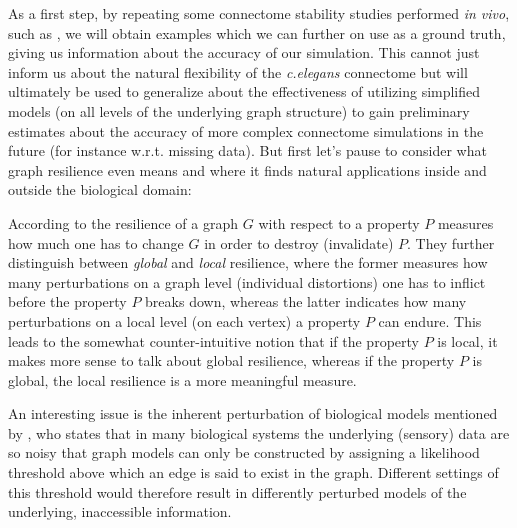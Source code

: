 \documentclass[a4paper,11pt]{article}
\begin{document}
As a first step, by repeating some connectome stability studies performed \emph{in vivo}, such as \citep{Avery1989473}, we will obtain examples which we can further on use as a ground truth, giving us information about the accuracy of our simulation. This cannot just inform us about the natural flexibility of the \emph{c.elegans} connectome but will ultimately be used to generalize about the effectiveness of utilizing simplified models (on all levels of the underlying graph structure) to gain preliminary estimates about the accuracy of more complex connectome simulations in the future (for instance w.r.t. missing data). But first let's pause to consider what graph resilience even means and where it finds natural applications inside and outside the biological domain:

According to \citep{Sudakov2008LocalGlobal} the resilience of a graph $G$ with respect to a property $P$ measures how much one has to change $G$ in order to destroy (invalidate) $P$. They further distinguish between \textit{global} and \textit{local} resilience, where the former measures how many perturbations on a graph level (individual distortions) one has to inflict before the property $P$ breaks down, whereas the latter indicates how many perturbations on a local level (on each vertex) a property $P$ can endure. This leads to the somewhat counter-intuitive notion that if the property $P$ is local, it makes more sense to talk about global resilience, whereas if the property $P$ is global, the local resilience is a more meaningful measure.

An interesting issue is the inherent perturbation of biological models mentioned by \citep{Hendrix2010MaxCliqueTheory}, who states that in many biological systems the underlying (sensory) data are so noisy that graph models can only be constructed by assigning a likelihood threshold above which an edge is said to exist in the graph. Different settings of this threshold would therefore result in differently perturbed models of the underlying, inaccessible information.

\end{document}
